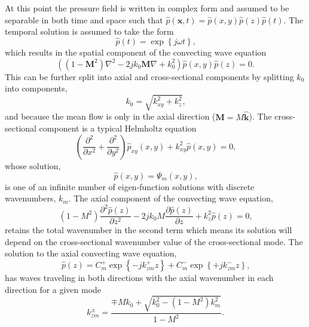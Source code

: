 At this point the pressure field is written in complex form and assumed to be separable in both time and space such that $\hat{p}(\mathbf{x},t) = \hat{p}(x,y)\hat{p}(z)\hat{p}(t)$.
The temporal solution is assumed to take the form
\begin{equation}
  \hat{p}(t) = \exp\left\{j\omega t\right\} \textrm{,}
  \label{eqn:02_pressure_solution_time}
\end{equation}
which results in the spatial component of the convecting wave equation
\begin{equation}
  \left((1-\mathbf{M}^2)\nabla^2-2jk_0\mathbf{M}\nabla+k_0^2\right)\hat{p}(x,y)\hat{p}(z) = 0 \textrm{.}
  \label{eqn:02_wave_conv_space}
\end{equation}
This can be further split into axial and cross-sectional components by splitting $k_0$ into components,
\begin{equation}
  k_0 = \sqrt{k_{xy}^2+k_z^2} \textrm{,}
  \label{eqn:02_k0}
\end{equation}
and because the mean flow is only in the axial direction ($\mathbf{M} = M\mathbf{\hat{k}}$).
The cross-sectional component is a typical Helmholtz equation
\begin{equation}
  \left(\frac{\partial^2}{\partial x^2}+\frac{\partial^2}{\partial y^2}\right)\hat{p}_{xy}(x,y)+k_{xy}^2\hat{p}(x,y) = 0 \textrm{,}
  \label{eqn:02_wave_xy}
\end{equation}
whose solution,
\begin{equation}
  \hat{p}(x,y) = \Psi_m(x,y) \textrm{,}
  \label{eqn:02_pressure_solution_xy}
\end{equation}
is one of an infinite number of eigen-function solutions with discrete wavenumbers, $k_m$.
The axial component of the convecting wave equation,
\begin{equation}
  (1-M^2)\frac{\partial^2\hat{p}(z)}{\partial z^2} - 2jk_0M\frac{\partial\hat{p}(z)}{\partial z} + k_z^2\hat{p}(z) = 0 \textrm{,}
  \label{eqn:02_wave_z}
\end{equation}
retains the total wavenumber in the second term which means its solution will depend on the cross-sectional wavenumber value of the cross-sectional mode.
The solution to the axial convecting wave equation,
\begin{equation}
  \hat{p}(z) = C^+_m\exp{\left\{-jk^+_{zm}z\right\}}+C^-_m\exp{\left\{+jk^-_{zm}z\right\}} \textrm{,}
  \label{eqn:02_pressure_solution_z}
\end{equation}
has waves traveling in both directions with the axial wavenumber in each direction for a given mode
\begin{equation}
  k^\pm_{zm} = \frac{\mp Mk_0+\sqrt{k_0^2-(1-M^2)k_m^2}}{1-M^2} \textrm{.}
  \label{eqn:02_kzm}
\end{equation}

